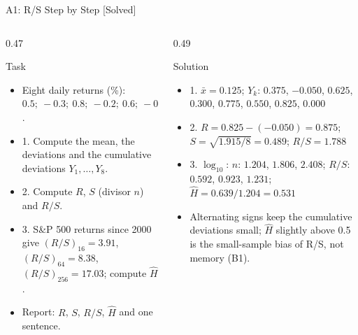 \begin{frame}{A1: R/S Step by Step [Solved]}
\itemsize{\scriptsize}
\begin{columns}[T]
\begin{column}{0.47\textwidth}
\begin{block}{Task}
\begin{itemize}
    \item Eight daily returns (\%): $0.5;\ -0.3;\ 0.8;\ -0.2;\ 0.6;\ -0.1;\ 0.4;\ -0.7$.
    \item 1. Compute the mean, the deviations and the cumulative deviations $Y_1, \dots, Y_8$.
    \item 2. Compute $R$, $S$ (divisor $n$) and $R/S$.
    \item 3. S\&P 500 returns since 2000 give $(R/S)_{16} = 3.91$, $(R/S)_{64} = 8.38$, $(R/S)_{256} = 17.03$; compute $\hat H$.
    \item Report: $R$, $S$, $R/S$, $\hat H$ and one sentence.
\end{itemize}
\end{block}
\end{column}
\begin{column}{0.49\textwidth}
\begin{exampleblock}{Solution}
\begin{itemize}
    \item 1. $\bar x = 0.125$; $Y_k$: $0.375$, $-0.050$, $0.625$, $0.300$, $0.775$, $0.550$, $0.825$, $0.000$
    \item 2. $R = 0.825 - (-0.050) = 0.875$; $S = \sqrt{1.915/8} = 0.489$; $R/S = 1.788$
    \item 3. $\log_{10}$: $n$: $1.204$, $1.806$, $2.408$; $R/S$: $0.592$, $0.923$, $1.231$; $\hat H = 0.639/1.204 = 0.531$
    \item Alternating signs keep the cumulative deviations small; $\hat H$ slightly above 0.5 is the small-sample bias of R/S, not memory (B1).
\end{itemize}
\end{exampleblock}
\end{column}
\end{columns}
\end{frame}

